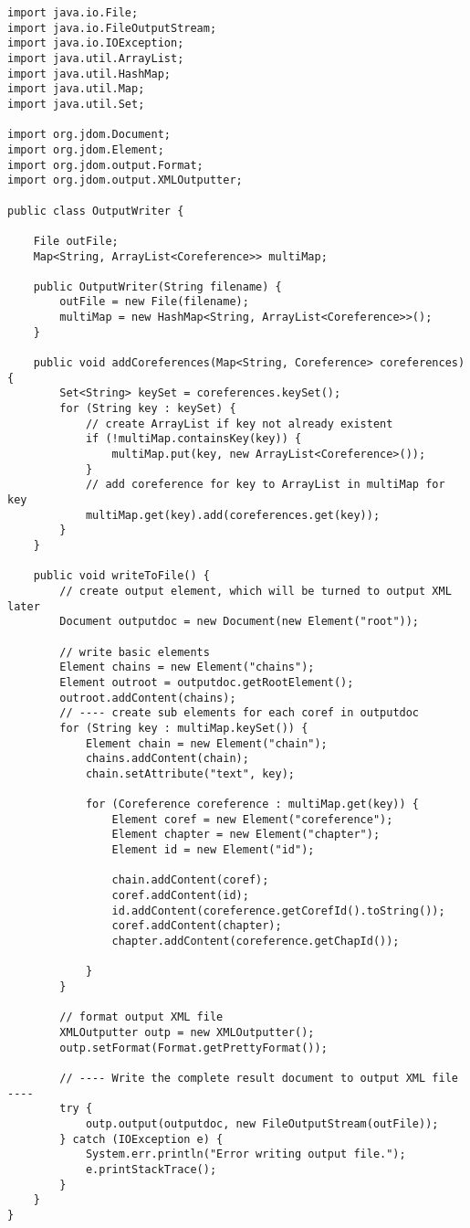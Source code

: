 \begin{lstlisting}[caption=OutputWriter-Klasse der BuildIndex,label=code:OutputWriter, name=OutputWriter.java]
import java.io.File;
import java.io.FileOutputStream;
import java.io.IOException;
import java.util.ArrayList;
import java.util.HashMap;
import java.util.Map;
import java.util.Set;

import org.jdom.Document;
import org.jdom.Element;
import org.jdom.output.Format;
import org.jdom.output.XMLOutputter;

public class OutputWriter {

	File outFile;
	Map<String, ArrayList<Coreference>> multiMap;

	public OutputWriter(String filename) {
		outFile = new File(filename);
		multiMap = new HashMap<String, ArrayList<Coreference>>();
	}

	public void addCoreferences(Map<String, Coreference> coreferences) {
		Set<String> keySet = coreferences.keySet();
		for (String key : keySet) {
			// create ArrayList if key not already existent
			if (!multiMap.containsKey(key)) {
				multiMap.put(key, new ArrayList<Coreference>());
			}
			// add coreference for key to ArrayList in multiMap for key
			multiMap.get(key).add(coreferences.get(key));
		}
	}

	public void writeToFile() {
		// create output element, which will be turned to output XML later
		Document outputdoc = new Document(new Element("root"));

		// write basic elements
		Element chains = new Element("chains");
		Element outroot = outputdoc.getRootElement();
		outroot.addContent(chains);
		// ---- create sub elements for each coref in outputdoc
		for (String key : multiMap.keySet()) {
			Element chain = new Element("chain");
			chains.addContent(chain);
			chain.setAttribute("text", key);

			for (Coreference coreference : multiMap.get(key)) {
				Element coref = new Element("coreference");
				Element chapter = new Element("chapter");
				Element id = new Element("id");

				chain.addContent(coref);
				coref.addContent(id);
				id.addContent(coreference.getCorefId().toString());
				coref.addContent(chapter);
				chapter.addContent(coreference.getChapId());

			}
		}

		// format output XML file
		XMLOutputter outp = new XMLOutputter();
		outp.setFormat(Format.getPrettyFormat());

		// ---- Write the complete result document to output XML file ----
		try {
			outp.output(outputdoc, new FileOutputStream(outFile));
		} catch (IOException e) {
			System.err.println("Error writing output file.");
			e.printStackTrace();
		}
	}
}
\end{lstlisting}
 